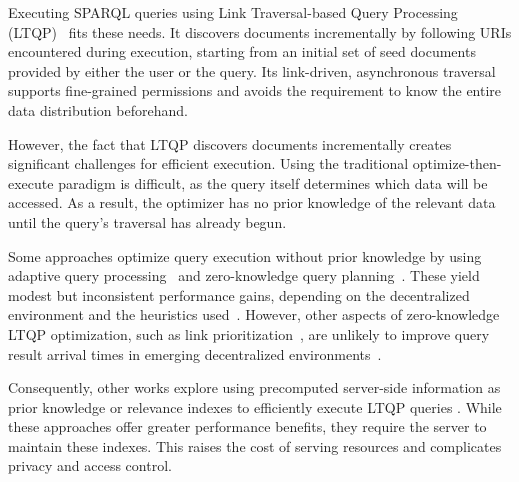 Executing SPARQL queries using Link Traversal-based Query Processing (LTQP)~\cite{hartig2009executing} fits these needs. 
It discovers documents incrementally by following URIs encountered during execution, starting from an initial set of seed documents provided by either the user or the query. 
Its link-driven, asynchronous traversal supports fine-grained permissions and avoids the requirement to know the entire data distribution beforehand.

However, the fact that LTQP discovers documents incrementally creates significant challenges for efficient execution. 
Using the traditional optimize-then-execute paradigm is difficult, as the query itself determines which data will be accessed. 
As a result, the optimizer has no prior knowledge of the relevant data until the query’s traversal has already begun.

Some approaches optimize query execution without prior knowledge by using adaptive query processing~\cite{hanski2025link} and zero-knowledge query planning~\cite{hartig2011zero}. 
These yield modest but inconsistent performance gains, depending on the decentralized environment and the heuristics used~\cite{taelman2023link}.
However, other aspects of zero-knowledge LTQP optimization, such as link prioritization~\cite{hartig2016walking},
are unlikely to improve query result arrival times in emerging decentralized environments~\cite{eschauzier2025revisiting}.

Consequently, other works explore using precomputed server-side information as prior knowledge 
or relevance indexes to efficiently execute LTQP queries \newline \cite{tam2024opportunities,umbrich2011comparing,hanski2024observations}.
While these approaches offer greater performance benefits, they require the server to maintain these indexes.
This raises the cost of serving resources and complicates privacy and access control.

